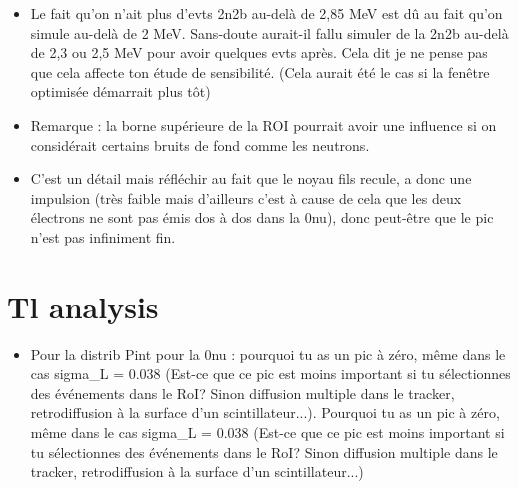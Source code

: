\documentclass[a4paper,12pt, twoside]{memoir}   	%
\begin{document}
\begin{itemize}
               \item Le fait qu'on n'ait plus d'evts 2n2b au-delà de 2,85 MeV est dû au fait qu'on simule au-delà de 2 MeV. Sans-doute aurait-il fallu simuler de la 2n2b au-delà de 2,3 ou 2,5 MeV pour avoir quelques evts après. Cela dit je ne pense pas que cela affecte ton étude de sensibilité. (Cela aurait été le cas si la fenêtre optimisée démarrait plus tôt)
               \item Remarque : la borne supérieure de la ROI pourrait avoir une influence si on considérait certains bruits de fond comme les neutrons.
               \item C'est un détail mais réfléchir au fait que le noyau fils recule, a donc une impulsion (très faible mais d'ailleurs c'est à cause de cela que les deux électrons ne sont pas émis dos à dos dans la 0nu), donc peut-être que le pic n'est pas infiniment fin.

               \end{itemize}

               \chapter{Tl analysis}
               \begin{itemize}
               \item Pour la distrib Pint pour la 0nu : pourquoi tu as un pic à zéro, même dans le cas sigma_L = 0.038 (Est-ce que ce pic est moins important si tu sélectionnes des événements dans le RoI? Sinon diffusion multiple dans le tracker, retrodiffusion à la surface d'un scintillateur...). Pourquoi tu as un pic à zéro, même dans le cas sigma_L = 0.038 (Est-ce que ce pic est moins important si tu sélectionnes des événements dans le RoI? Sinon diffusion multiple dans le tracker, retrodiffusion à la surface d'un scintillateur...)
               \end{itemize}

               
\end{document}
